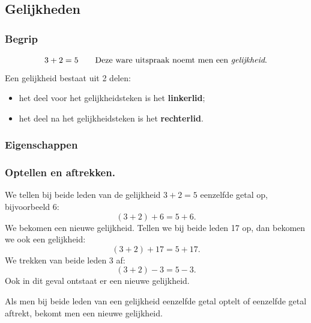 \documentclass{bis}
\begin{document}

\subsection{Gelijkheden}

\subsubsection{Begrip}

\[3+2=5\qquad\text{Deze ware uitspraak noemt men een \emph{gelijkheid}.}\]
Een gelijkheid bestaat uit 2 delen:
\begin{itemize}
  \item het deel voor het gelijkheidsteken is het \textbf{linkerlid};
  \item het deel na het gelijkheidsteken is het \textbf{rechterlid}.
\end{itemize}
\begin{center}
\end{center}

\subsubsection{Eigenschappen}

\subsubsection*{Optellen en aftrekken.}
We tellen bij beide leden van de gelijkheid $3+2=5$ eenzelfde getal op, bijvoorbeeld 6:
\[(3+2)+6=5+6.\]
We bekomen een nieuwe gelijkheid. Tellen we bij beide leden 17 op, dan bekomen we ook een
gelijkheid:
\[(3+2)+17=5+17.\]
We trekken van beide leden 3 af:
\[(3+2)-3=5-3.\]
Ook in dit geval ontstaat er een nieuwe gelijkheid.
\begin{onthoud}
Als men bij beide leden van een gelijkheid eenzelfde getal optelt of eenzelfde getal aftrekt,
bekomt men een nieuwe gelijkheid.
\end{onthoud}
\end{document}
